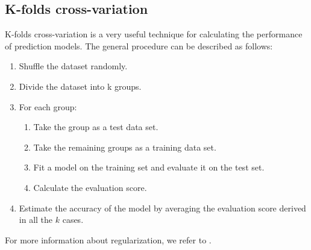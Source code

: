 \documentclass [11pt]{article}
\begin{document}
\subsection{K-folds cross-variation}
\label{sec_kcross}
K-folds cross-variation is a very useful technique for calculating the performance of prediction models. The general procedure can be described as follows:
\begin{enumerate}
\item Shuffle the dataset randomly.
\item Divide the dataset into k groups.
\item For each group:
\begin{enumerate}
\item Take the group as a test data set.
\item Take the remaining groups as a training data set.
\item Fit a model on the training set and evaluate it on the test set.
\item Calculate the evaluation score.
\end{enumerate}
\item Estimate the accuracy of the model by averaging the evaluation score derived in all the $k$ cases.
\end{enumerate}
For more information about regularization, we refer to \cite{TRJ}.
\end{document}
